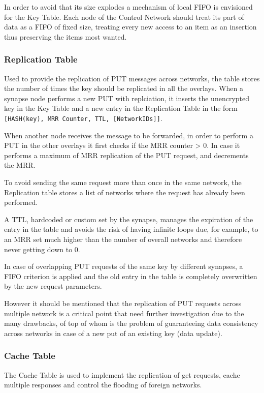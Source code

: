 In order to avoid that its size explodes a mechanism of local FIFO is envisioned for the Key Table. Each node of the Control Network should
treat its part of data as a FIFO of fixed size, treating every new access to an item as an insertion thus preserving the items most wanted.

\subsubsection{Replication Table}
%
Used to provide the replication of PUT messages across networks, the table stores the number of times the key should be replicated in all the overlays.
When a synapse node performs a new PUT with replciation, it inserts the unencrypted key in the Key Table and a new entry in the Replication Table in the form {\tt [HASH(key), MRR Counter, TTL, [NetworkIDs]]}.

When another node receives the message to be forwarded, in order to perform a PUT in the other overlays it first checks if the MRR counter > 0.
In case it performs a maximum of MRR replication of the PUT request, and decrements the MRR.

To avoid sending the same request more than once in the same network, the Replication table stores a list of networks where the request has already been performed.

A TTL, hardcoded or custom set by the synapse, manages the expiration of the entry in the table and avoids the risk of having infinite loops due, for example, to an MRR set much higher than the number of overall networks and therefore never getting down to 0.

In case of overlapping PUT requests of the same key by different synapses, a FIFO criterion is applied and the old entry in the table is completely overwritten by the new request parameters.

However it should be mentioned that the replication of PUT requests across multiple network is a critical point that need further investigation due to the many drawbacks, of top of whom is the problem of guaranteeing data consistency across networks in case of a new put of an existing key (data update).

\subsubsection{Cache Table}
%
The Cache Table is used to implement the replication of get requests, cache multiple responses and control the flooding of foreign networks.

